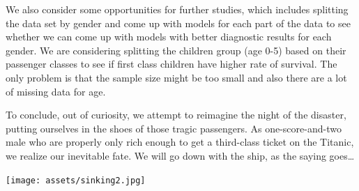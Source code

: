 \documentclass[12pt, oneside]{book}
\theoremstyle{definition}
\theoremstyle{definition}
\theoremstyle{definition}
\theoremstyle{remark}
\begin{document}
We also consider some opportunities for further studies, which includes
splitting the data set by gender and come up with models for each part
of the data to see whether we can come up with models with better
diagnostic results for each gender. We are considering splitting the
children group (age 0-5) based on their passenger classes to see if
first class children have higher rate of survival. The only problem is
that the sample size might be too small and also there are a lot of
missing data for age.

To conclude, out of curiosity, we attempt to reimagine the night of the
disaster, putting ourselves in the shoes of those tragic passengers. As
one-score-and-two male who are properly only rich enough to get a
third-class ticket on the Titanic, we realize our inevitable fate. We
will go down with the ship, as the saying goes\ldots{}

\texttt{[image: assets/sinking2.jpg]}


\end{document}
